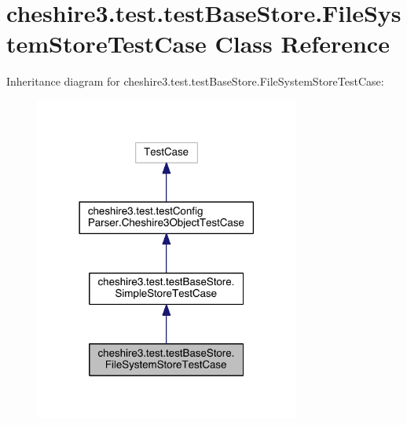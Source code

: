 \hypertarget{classcheshire3_1_1test_1_1test_base_store_1_1_file_system_store_test_case}{\section{cheshire3.\-test.\-test\-Base\-Store.\-File\-System\-Store\-Test\-Case Class Reference}
\label{classcheshire3_1_1test_1_1test_base_store_1_1_file_system_store_test_case}
}


Inheritance diagram for cheshire3.\-test.\-test\-Base\-Store.\-File\-System\-Store\-Test\-Case\-:
\nopagebreak
\begin{figure}[H]
\begin{center}
\leavevmode
\includegraphics[width=246pt]{classcheshire3_1_1test_1_1test_base_store_1_1_file_system_store_test_case__inherit__graph}
\end{center}
\end{figure}


